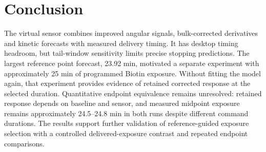 \documentclass[lettersize,journal]{IEEEtran}
\begin{document}
\section{Conclusion}
The virtual sensor combines improved angular signals, bulk-corrected
derivatives and kinetic forecasts with measured delivery timing. It has
desktop timing headroom, but tail-window sensitivity limits precise
stopping predictions. The largest reference point forecast, 23.92 min,
motivated a separate experiment with approximately 25 min of programmed
Biotin exposure. Without fitting the model again, that experiment provides
evidence of retained corrected response at the selected duration.
Quantitative endpoint equivalence remains unresolved: retained response
depends on baseline and sensor, and measured midpoint exposure remains
approximately 24.5--24.8 min in both runs despite different command
durations. The results support further validation of reference-guided
exposure selection with a controlled delivered-exposure contrast and
repeated endpoint comparisons.
\end{document}
